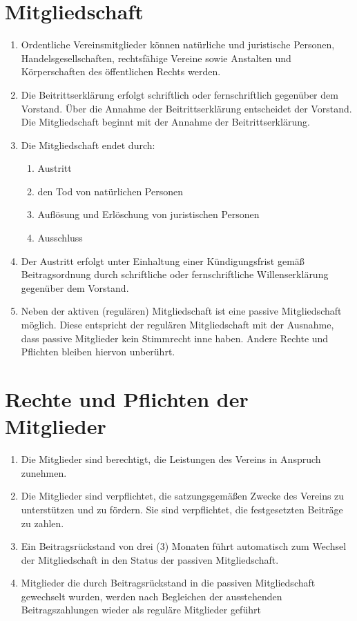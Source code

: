 \documentclass[a4paper, 12pt]{scrartcl}
\begin{document}
\section{Mitgliedschaft}
     \begin{enumerate}
	  \item Ordentliche Vereinsmitglieder können natürliche und juristische Personen, Handelsgesellschaften, rechtsfähige Vereine sowie Anstalten und Körperschaften des öffentlichen Rechts werden.  
  
	  \item Die Beitrittserklärung erfolgt schriftlich oder fernschriftlich gegenüber dem Vorstand. Über die Annahme der Beitrittserklärung entscheidet der Vorstand. Die Mitgliedschaft beginnt mit der Annahme der Beitrittserklärung.  
  
	  \item Die Mitgliedschaft endet durch:  
	       \begin{enumerate}
		    \item Austritt  
		    \item den Tod von natürlichen Personen  
		    \item Auflösung und Erlöschung von juristischen Personen  
		    \item Ausschluss
	       \end{enumerate}
  
	  \item Der Austritt erfolgt unter Einhaltung einer Kündigungsfrist gemäß Beitragsordnung durch schriftliche oder fernschriftliche Willenserklärung gegenüber dem Vorstand.

	  \item Neben der aktiven (regulären) Mitgliedschaft ist eine passive Mitgliedschaft möglich.  
Diese entspricht der regulären Mitgliedschaft mit der Ausnahme, dass passive Mitglieder kein Stimmrecht inne haben. Andere Rechte und Pflichten bleiben hiervon unberührt.  
     \end{enumerate}

\section{Rechte und Pflichten der Mitglieder}
     \begin{enumerate}
	  \item Die Mitglieder sind berechtigt, die Leistungen des Vereins in Anspruch zunehmen.  
	  \item Die Mitglieder sind verpflichtet, die satzungsgemäßen Zwecke des Vereins zu unterstützen und zu fördern. Sie sind verpflichtet, die festgesetzten Beiträge zu zahlen.
	  \item Ein Beitragsrückstand von drei (3) Monaten führt automatisch zum Wechsel der Mitgliedschaft in den Status der passiven Mitgliedschaft.  
	  \item Mitglieder die durch Beitragsrückstand in die passiven Mitgliedschaft gewechselt wurden, werden nach Begleichen der ausstehenden Beitragszahlungen wieder als reguläre Mitglieder geführt
     \end{enumerate}
\end{document}
